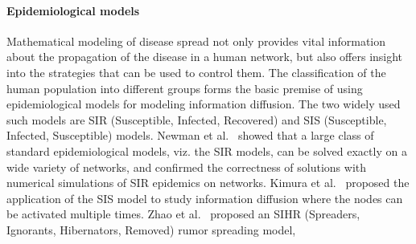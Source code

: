 \paragraph{Epidemiological models}
Mathematical modeling of disease spread not only provides vital information about the propagation of the disease in a human network, but also offers insight into the strategies that can be used to control them.
The classification of the human population into different groups forms
the basic premise of using epidemiological models for modeling
information diffusion.
The two widely used such models are SIR (Susceptible, Infected, Recovered) and SIS (Susceptible, Infected, Susceptible) models. Newman et al.~\cite{PhysRevE.66.016128} showed that a large class of standard
epidemiological models, viz. the SIR models, can be solved exactly on a wide variety of networks, and confirmed the correctness of solutions with numerical simulations of SIR epidemics on networks. Kimura et al.~\cite{Kimura:2009:EEI:1661445.1661772} proposed the application
of the SIS model to study information diffusion where the nodes can be activated multiple times.
Zhao et al.~\cite{RePEc:eee:phsmap:v:392:y:2013:i:4:p:987-994} proposed an SIHR (Spreaders, Ignorants, Hibernators, Removed) rumor spreading model,
